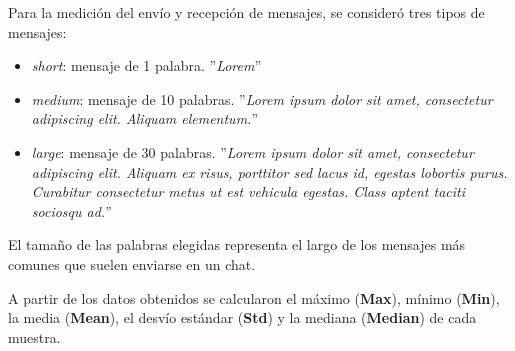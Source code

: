 Para la medición del envío y recepción de mensajes, se consideró tres tipos de mensajes:

\begin{itemize}
    \item \textit{short}: mensaje de 1 palabra. ''\textit{Lorem}''
    \item \textit{medium}: mensaje de 10 palabras. ''\textit{Lorem ipsum dolor sit amet, consectetur adipiscing elit. Aliquam elementum.}''
    \item \textit{large}: mensaje de 30 palabras. ''\textit{Lorem ipsum dolor sit amet, consectetur adipiscing elit. Aliquam ex risus, porttitor sed lacus id, egestas lobortis purus. Curabitur consectetur metus ut est vehicula egestas. Class aptent taciti sociosqu ad.}''
\end{itemize}

El tamaño de las palabras elegidas representa el largo de los mensajes más comunes que suelen enviarse en un chat.

A partir de los datos obtenidos se calcularon el máximo (\textbf{Max}), mínimo (\textbf{Min}), la media (\textbf{Mean}), el desvío estándar (\textbf{Std}) y la mediana (\textbf{Median}) de cada muestra.